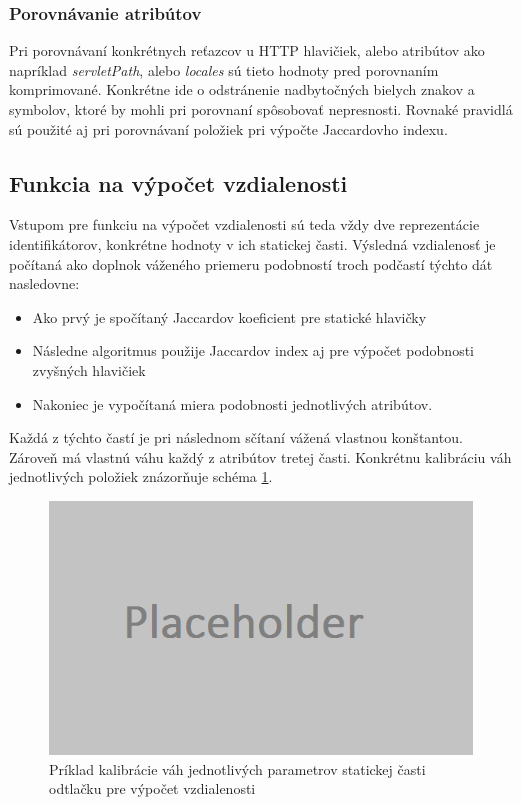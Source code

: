 \documentclass[
  printed, %
  table,   %
  lof,     %
  lot,     %
]{fithesis3}
\begin{document}
\subsubsection{Porovnávanie atribútov}
Pri porovnávaní konkrétnych reťazcov u HTTP hlavičiek, alebo atribútov ako
napríklad \textit{servletPath}, alebo \textit{locales} sú tieto hodnoty pred
porovnaním komprimované. Konkrétne ide o odstránenie nadbytočných bielych
znakov a symbolov, ktoré by mohli pri porovnaní spôsobovať nepresnosti. Rovnaké
pravidlá sú použité aj pri porovnávaní položiek pri výpočte Jaccardovho indexu.

\subsection{Funkcia na výpočet vzdialenosti}
\label{ss:distance-function}
Vstupom pre funkciu na výpočet vzdialenosti sú teda vždy dve reprezentácie
identifikátorov, konkrétne hodnoty v ich statickej časti. Výsledná vzdialenosť
je počítaná ako doplnok váženého priemeru podobností troch podčastí týchto dát
nasledovne:

\begin{itemize}
	\item Ako prvý je spočítaný Jaccardov koeficient pre statické hlavičky
	\item Následne algoritmus použije Jaccardov index aj pre výpočet podobnosti
	zvyšných hlavičiek
	\item Nakoniec je vypočítaná miera podobnosti jednotlivých atribútov. 
\end{itemize}

Každá z týchto častí je pri následnom sčítaní vážená vlastnou konštantou.
Zároveň má vlastnú váhu každý z atribútov tretej časti. Konkrétnu kalibráciu
váh jednotlivých položiek znázorňuje schéma \ref{fig:footprint-distance-cal}.

\begin{figure}[H]
  \centering
    \includegraphics[width=.99\textwidth]{images/footprint-distance-cal.png}
  \caption{Príklad kalibrácie váh jednotlivých parametrov statickej časti
  odtlačku pre výpočet vzdialenosti}
  \label{fig:footprint-distance-cal}
\end{figure}
\end{document}

